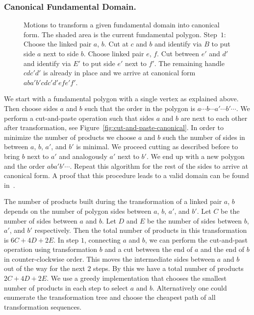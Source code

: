 \documentclass[Thesis]{subfiles}
\begin{document}
\subsubsection*{Canonical Fundamental Domain.}

\begin{figure}
\centering
{}
\caption{Motions to transform a given fundamental domain into canonical form. The shaded area is the current fundamental polygon. Step~$1$: Choose the linked pair $a$, $b$. Cut at $c$ and $b$ and identify via $B$ to put side $a$ next to side $b$. Choose linked pair $e$, $f$. Cut between $e'$ and $d'$ and identify via $E'$ to put side $e'$ next to $f'$. The remaining handle $cdc'd'$ is already in place and we arrive at canonical form $aba'b'cdc'd'efe'f'$.}
\label{fig:canonical_algorithm}
\end{figure}

We start with a fundamental polygon with a single vertex as explained above. 
Then choose sides $a$ and $b$ such that the order in the polygon is $a\cdots b \cdots a' \cdots b' \cdots$. 
We perform a cut-and-paste operation such that sides $a$ and $b$ are next to each other after transformation, see Figure~\ref{fig:cut-and-paste-canonical}. 
In order to minimize the number of products we choose $a$ and $b$ such the number of sides in between $a$, $b$, $a'$, and $b'$ is minimal. 
We proceed cutting as described before to bring $b$ next to $a'$ and analogously $a'$ next to $b'$. 
We end up with a new polygon and the order $aba'b'\cdots$. 
Repeat this algorithm for the rest of the sides to arrive at canonical form. 
A proof that this procedure leads to a valid domain can be found in~\cite{Jost2007}.

The number of products built during the transformation of a linked pair $a$, $b$ depends on the number of polygon sides between $a$, $b$, $a'$, and $b'$. 
Let $C$ be the number of sides between $a$ and $b$. Let $D$ and $E$ be the number of sides between $b$, $a'$, and $b'$ respectively. 
Then the total number of products in this transformation is $6C+4D+2E$. 
In step $1$, connecting $a$ and $b$, we can perform the cut-and-past operation using transformation $b$ and a cut between the end of $a$ and the end of $b$ in counter-clockwise order. 
This moves the intermediate sides between $a$ and $b$ out of the way for the next $2$ steps. 
By this we have a total number of products $2C+4D+2E$. 
We use a greedy implementation that chooses the smallest number of products in each step to select $a$ and $b$.
Alternatively one could enumerate the transformation tree and choose the cheapest path of all transformation sequences.
\end{document}
